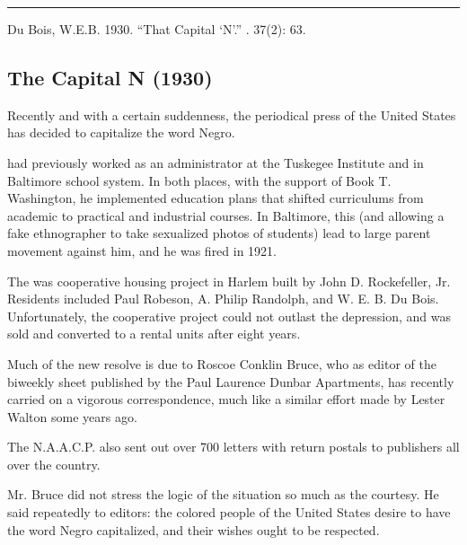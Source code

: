 \documentclass[letterpaper,10pt,english]{jupyterBook}
\begin{document}
\bigskip\hrule\bigskip


\sphinxAtStartPar
{} Du Bois, W.E.B. 1930. “That Capital ‘N’.” . 37(2): 63.


\subsection{The Capital N (1930)}
\label{\detokenize{Volumes/37/05/capital_n:the-capital-n-1930}}\label{\detokenize{Volumes/37/05/capital_n::doc}}
\sphinxAtStartPar
Recently and with a certain suddenness, the periodical press of the United States has decided to capitalize the word Negro.

\begin{sphinxShadowBox}
\sphinxstylesidebartitle{}

\sphinxAtStartPar
{} had previously worked as an administrator at the Tuskegee Institute and in Baltimore school system. In both places, with the support of Book T. Washington, he implemented education plans that shifted curriculums from academic to practical and industrial courses. In Baltimore, this (and allowing a fake ethnographer to take sexualized photos of students) lead to large parent movement against him, and he was fired in 1921.

\sphinxAtStartPar
The  was co\sphinxhyphen{}operative housing project in Harlem built by John D. Rockefeller, Jr. Residents included Paul Robeson, A. Philip Randolph, and W. E. B. Du Bois. Unfortunately, the co\sphinxhyphen{}operative project could not outlast the depression, and was sold and converted to a rental units after eight years.
\end{sphinxShadowBox}

\sphinxAtStartPar
Much of the new resolve is due to Roscoe Conklin Bruce, who as editor of the bi\sphinxhyphen{}weekly sheet published by the Paul Laurence Dunbar Apartments, has recently carried on a vigorous correspondence, much like a similar effort made by Lester Walton some years ago.

\sphinxAtStartPar
The N.A.A.C.P. also sent out over 700 letters with return postals to publishers all over the country.

\sphinxAtStartPar
Mr. Bruce did not stress the logic of the situation so much as the courtesy. He said repeatedly to editors: the colored people of the United States desire to have the word Negro capitalized, and their wishes ought to be respected.
\end{document}
